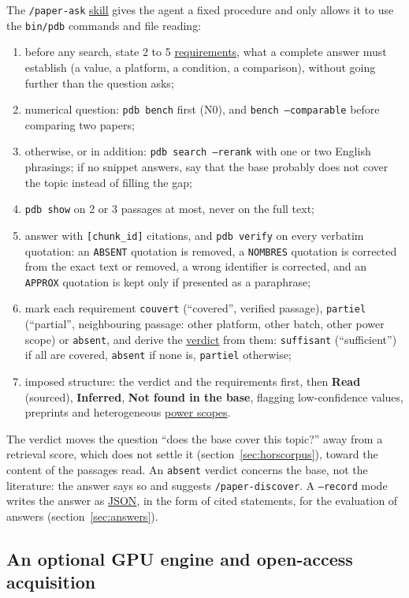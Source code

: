 \documentclass[11pt,a4paper]{article}
\newcommand{\cmd}[1]{\texttt{#1}}
\newcommand{\gl}[2]{\hyperlink{gl:#1}{\textcolor{glcolor}{#2}}}
\begin{document}
The \cmd{/paper-ask} \gl{skill}{skill} gives the agent a fixed procedure and only allows it to use the
\cmd{bin/pdb} commands and file reading:
\begin{enumerate}
  \item before any search, state 2 to 5 \gl{exigence}{requirements}, what a complete answer must
    establish (a value, a platform, a condition, a comparison), without going further than
    the question asks;
  \item numerical question: \cmd{pdb bench} first (N0), and \cmd{bench --comparable} before
    comparing two papers;
  \item otherwise, or in addition: \cmd{pdb search --rerank} with one or two English
    phrasings; if no snippet answers, say that the base probably does not cover the topic
    instead of filling the gap;
  \item \cmd{pdb show} on 2 or 3 passages at most, never on the full text;
  \item answer with \cmd{[chunk\_id]} citations, and \cmd{pdb verify} on every verbatim
    quotation: an \cmd{ABSENT} quotation is removed, a \cmd{NOMBRES} quotation is corrected
    from the exact text or removed, a wrong identifier is corrected, and an \cmd{APPROX}
    quotation is kept only if presented as a paraphrase;
  \item mark each requirement \cmd{couvert} (``covered'', verified passage), \cmd{partiel}
    (``partial'', neighbouring passage: other platform, other batch, other power scope) or
    \cmd{absent}, and derive the \gl{verdict}{verdict} from them: \cmd{suffisant} (``sufficient'') if all are covered,
    \cmd{absent} if none is, \cmd{partiel} otherwise;
  \item imposed structure: the verdict and the requirements first, then \textbf{Read}
    (sourced), \textbf{Inferred}, \textbf{Not found in the base}, flagging low-confidence
    values, preprints and heterogeneous \gl{scope}{power scopes}.
\end{enumerate}
The verdict moves the question ``does the base cover this topic?'' away from a retrieval
score, which does not settle it (section~\ref{sec:horscorpus}), toward the content of the
passages read. An \cmd{absent} verdict concerns the base, not the literature: the answer says
so and suggests \cmd{/paper-discover}. A \cmd{--record} mode writes the answer as \gl{JSON}{JSON}, in
the form of cited statements, for the evaluation of answers (section~\ref{sec:answers}).

\subsection{An optional GPU engine and open-access acquisition}
\label{sec:qwen}
\end{document}
